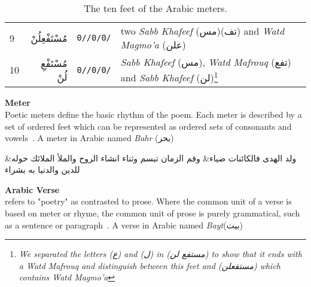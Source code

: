 \begin{savenotes}
\begin{table}[t]
\begin{tabular}{l r r l}
    9 &\textarabic{مُسْتَفْعِلُنْ} & \texttt{0//0/0/}  &  two \textit{Sabb Khafeef} (\textarabic{مس})(\textarabic{تف}) and \textit{Watd Magmo'a} (\textarabic{علن}) \\
    10 &\textarabic{مُسْتَفْعِ لُنْ} & \texttt{0//0/0/}  & \textit{Sabb Khafeef} (\textarabic{مس}), \textit{Watd Mafrouq}  (\textarabic{تفع}) and \textit{Sabb Khafeef}  (\textarabic{لن})\footnote{\textit{We separated the letters (\textarabic{ع}) and (\textarabic{ل}) in (\textarabic{مستفع لن}) to show that it ends with a \textit{Watd Mafrouq} and distinguish between this feet  and (\textarabic{مستفعلن}) which contains \textit{Watd Magmo'a} }}\\


    \hline
  \end{tabular}
  \caption{The ten feet of the Arabic meters. }\label{arud:feet}
\end{table}
    \end{savenotes}


    
\begin{definition}\label{def:meter}
  \textbf{Meter} \hfill \\
  Poetic meters define the basic rhythm of the poem. Each meter is described by a set of ordered feet which can be represented as ordered sets of consonants and vowels~\cite{Almuhareb2015}. A meter in Arabic named \textit{Bahr}   (\textarabic{بحر})
\begin{Arabic}
	\begin{traditionalpoem*}
          ولد الهدى فالكائنات ضياء\quad & \quad وفم الزمان تبسم وثناء انشاء
          الروح والملأ الملائك حوله\quad & \quad للدين والدنيا به بشراء
	\end{traditionalpoem*}
\end{Arabic}%
\end{definition}

\begin{definition}\label{def:verse}
  \textbf{Arabic Verse} \hfill \\ refers to "poetry" as contrasted to prose. Where the common unit of a verse is based on meter or rhyme, the common unit of prose is purely grammatical, such as a sentence or paragraph~\cite{Wiki_Verse}. A verse in Arabic named \textit{Bayt}(\textarabic{بيت})
\end{definition}

